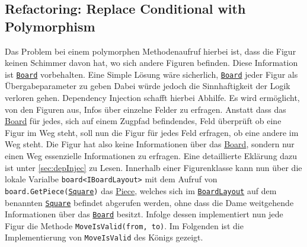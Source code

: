 \documentclass[
10pt, %
a4paper, %
oneside, %
headinclude,footinclude, %
BCOR5mm, %
]{scrartcl}
\begin{document}
\begin{onehalfspace}
\subsection{Refactoring: Replace Conditional with Polymorphism}
Das Problem bei einem polymorphen Methodenaufruf hierbei ist, dass die Figur keinen Schimmer davon hat, wo sich andere Figuren befinden. Diese Information ist \texttt{\href{https://github.com/schmida736/Chess-AdvancedSE/blob/main/Chess-AdvancedSE/Game\%20Elements/Board.cs}{Board}} vorbehalten. Eine Simple Lösung wäre sicherlich, \texttt{\href{https://github.com/schmida736/Chess-AdvancedSE/blob/main/Chess-AdvancedSE/Game\%20Elements/Board.cs}{Board}} jeder Figur als Übergabeparameter zu geben Dabei würde jedoch die Sinnhaftigkeit der Logik verloren gehen. Dependency Injection schafft hierbei Abhilfe. Es wird ermöglicht, von den Figuren aus, Infos über einzelne Felder zu erfragen. Anstatt dass das \href{https://github.com/schmida736/Chess-AdvancedSE/blob/main/Chess-AdvancedSE/Game\%20Elements/Board.cs}{Board} für jedes, sich auf einem Zugpfad befindendes, Feld überprüft ob eine Figur im Weg steht, soll nun die Figur für jedes Feld erfragen, ob eine andere im Weg steht. Die Figur hat also keine Informationen über das \href{https://github.com/schmida736/Chess-AdvancedSE/blob/main/Chess-AdvancedSE/Game\%20Elements/Board.cs}{Board}, sondern nur einen Weg essenzielle Informationen zu erfragen. Eine detaillierte Eklärung dazu ist unter \autoref{sec:depInjec} zu Lesen. Innerhalb einer Figurenklasse kann nun über die lokale Varialbe \texttt{board<IBoardLayout>} mit dem Aufruf von  \texttt{board.GetPiece(\href{https://github.com/schmida736/Chess-AdvancedSE/blob/main/Chess-AdvancedSE/Game\%20Elements/Square.cs}{Square})} das \href{https://github.com/schmida736/Chess-AdvancedSE/blob/main/Chess-AdvancedSE/Game\%20Elements/Pieces/Piece.cs}{Piece}, welches sich im \texttt{\href{https://github.com/schmida736/Chess-AdvancedSE/blob/main/Chess-AdvancedSE/Game\%20Elements/BoardLayout.cs}{BoardLayout}} auf dem benannten \texttt{\href{https://github.com/schmida736/Chess-AdvancedSE/blob/main/Chess-AdvancedSE/Game\%20Elements/Square.cs}{Square}} befindet abgerufen werden, ohne dass die Dame weitgehende Informationen über das \texttt{\href{https://github.com/schmida736/Chess-AdvancedSE/blob/main/Chess-AdvancedSE/Game\%20Elements/Board.cs}{Board}} besitzt.
Infolge dessen implementiert nun jede Figur die Methode \texttt{MoveIsValid(from, to)}. Im Folgenden ist die Implementierung von \texttt{MoveIsValid} des Königs gezeigt.


\end{onehalfspace}
\end{document}
